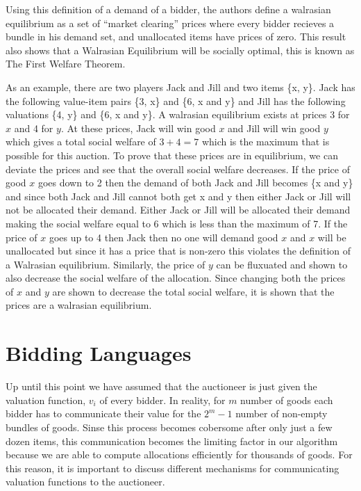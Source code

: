 \documentclass[10pt,onecolumn,letterpaper]{article}
\theoremstyle{definition}
\begin{document}
Using this definition of a demand of a bidder, the authors define a walrasian equilibrium as a set of ``market clearing'' prices where every bidder recieves a bundle in his demand set, and unallocated items have prices of zero. This result also shows that a Walrasian Equilibrium will be socially optimal, this is known as The First Welfare Theorem. 

As an example, there are two players Jack and Jill and two items \{x, y\}. Jack has the following value-item pairs \{3, x\} and \{6, x and y\} and Jill has the following valuations \{4, y\} and \{6, x and y\}. A walrasian equilibrium exists at prices 3 for $x$ and 4 for $y$. At these prices, Jack will win good $x$ and Jill will win good $y$ which gives a total social welfare of $3 + 4 = 7$ which is the maximum that is possible for this auction. To prove that these prices are in equilibrium, we can deviate the prices and see that the overall social welfare decreases. If the price of good $x$ goes down to 2 then the demand of both Jack and Jill becomes \{x and y\} and since both Jack and Jill cannot both get x and y then either Jack or Jill will not be allocated their demand. Either Jack or Jill will be allocated their demand making the social welfare equal to 6 which is less than the maximum of 7. If the price of $x$ goes up to 4 then Jack then no one will demand good $x$ and $x$ will be unallocated but since it has a price that is non-zero this violates the definition of a Walrasian equilibrium. Similarly, the price of $y$ can be fluxuated and shown to also decrease the social welfare of the allocation. Since changing both the prices of $x$ and $y$ are shown to decrease the total social welfare, it is shown that the prices are a walrasian equilibrium.

\section{Bidding Languages} %

Up until this point we have assumed that the auctioneer is just given the valuation function, $v_i$ of every bidder. In reality, for $m$ number of goods each bidder has to communicate their value for the $2^m - 1$ number of non-empty bundles of goods. Sinse this process becomes cobersome after only just a few dozen items, this communication becomes the limiting factor in our algorithm because we are able to compute allocations efficiently for thousands of goods. For this reason, it is important to discuss different mechanisms for communicating valuation functions to the auctioneer. 
\end{document}
